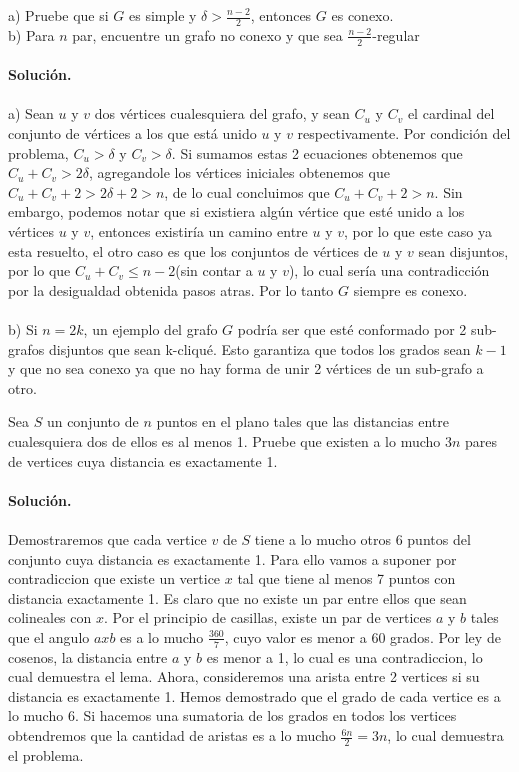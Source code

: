 \documentclass[12pt]{article}
\newenvironment{ejercicio}[2][Ejercicio]{\begin{trivlist}
\item[\hskip \labelsep {\bfseries #1}\hskip \labelsep {\bfseries #2.}]}{\end{trivlist}}
\begin{document}
\begin{ejercicio}{1.1.13}
\end{ejercicio}
a) Pruebe que si $G$ es simple y $\delta > \frac{n-2}{2}$, entonces $G$ es conexo. 
\\
b) Para $n$ par, encuentre un grafo no conexo y que sea $\frac{n-2}{2}$-regular
\\\\
\textbf{Solución.} 
\\\\
a) Sean $u$ y $v$ dos vértices cualesquiera del grafo, y sean $C_u$ y $C_v$ el cardinal del conjunto de vértices a los que está unido $u$ y $v$ respectivamente. Por condición del problema, $C_u > \delta$ y $C_v > \delta$. Si sumamos estas 2 ecuaciones obtenemos que $C_u + C_v > 2\delta$, agregandole los vértices iniciales obtenemos que $C_u + C_v + 2 > 2\delta + 2 > n$, de lo cual concluimos que $C_u + C_v +2 > n$. Sin embargo, podemos notar que si existiera algún vértice que esté unido a los vértices $u$ y $v$, entonces existiría un camino entre $u$ y $v$, por lo que este caso ya esta resuelto, el otro caso es que los conjuntos de vértices de $u$ y $v$ sean disjuntos, por lo que $C_u + C_v \leq  n-2$(sin contar a $u$ y $v$), lo cual sería una contradicción por la desigualdad obtenida pasos atras. Por lo tanto $G$ siempre es conexo.
\\\\
b) Si $n=2k$, un ejemplo del grafo $G$ podría ser que esté conformado por 2 sub-grafos disjuntos que sean k-cliqué. Esto garantiza que todos los grados sean $k-1$ y que no sea conexo ya que no hay forma de unir 2 vértices de un sub-grafo a otro.











\begin{ejercicio}{1.1.20}
\end{ejercicio}
Sea $S$ un conjunto de $n$ puntos en el plano tales que las distancias entre cualesquiera dos de ellos es al menos 1. Pruebe que existen a lo mucho $3n$ pares de vertices cuya distancia es exactamente 1.
\\\\
\textbf{Solución.} 
\\\\
Demostraremos que cada vertice $v$ de $S$ tiene a lo mucho otros 6 puntos del conjunto cuya distancia es exactamente 1. Para ello vamos a suponer por contradiccion que existe un vertice $x$ tal que tiene al menos 7 puntos con distancia exactamente 1. Es claro que no existe un par entre ellos que sean colineales con $x$. Por el principio de casillas, existe un par de vertices $a$ y $b$ tales que el angulo $axb$ es a lo mucho $\frac{360}{7}$, cuyo valor es menor a 60 grados. Por ley de cosenos, la distancia entre $a$ y $b$ es menor a 1, lo cual es una contradiccion, lo cual demuestra el lema.
Ahora, consideremos una arista entre 2 vertices si su distancia es exactamente 1. Hemos demostrado que el grado de cada vertice es a lo mucho 6. Si hacemos una sumatoria de los grados en todos los vertices obtendremos que la cantidad de aristas es a lo mucho $\frac{6n}{2} = 3n$, lo cual demuestra el problema.
\end{document}
